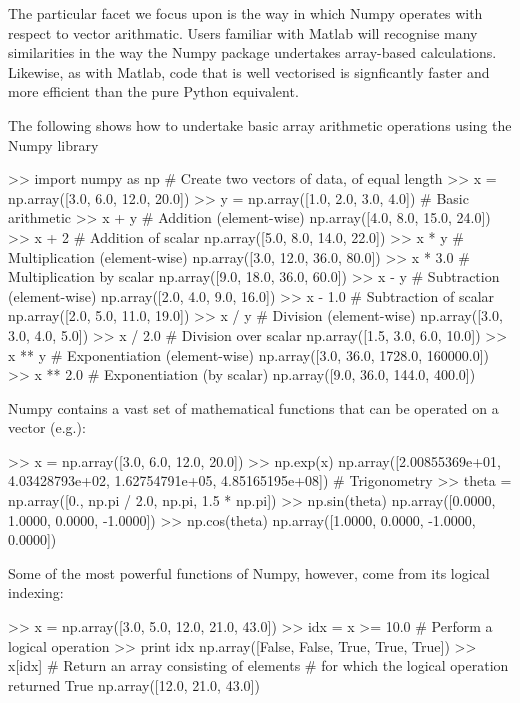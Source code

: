The particular facet we focus upon is the way in which Numpy operates with respect to vector arithmatic. Users familiar with Matlab will recognise many similarities in the way the Numpy package undertakes array-based calculations. Likewise, as with Matlab, code that is well vectorised is signficantly faster and more efficient than the pure Python equivalent. 

The following shows how to undertake basic array arithmetic operations using the Numpy library

\begin{python}[frame=single]
>> import numpy as np
# Create two vectors of data, of equal length
>> x = np.array([3.0, 6.0, 12.0, 20.0])
>> y = np.array([1.0, 2.0, 3.0, 4.0])
# Basic arithmetic
>> x + y   # Addition (element-wise)
np.array([4.0, 8.0, 15.0, 24.0])
>> x + 2   # Addition of scalar
np.array([5.0, 8.0, 14.0, 22.0])
>> x * y   # Multiplication (element-wise)
np.array([3.0, 12.0, 36.0, 80.0])
>> x * 3.0   # Multiplication by scalar
np.array([9.0, 18.0, 36.0, 60.0])
>> x - y   # Subtraction (element-wise)
np.array([2.0, 4.0, 9.0, 16.0])
>> x - 1.0   # Subtraction of scalar
np.array([2.0, 5.0, 11.0, 19.0])
>> x / y   # Division (element-wise)
np.array([3.0, 3.0, 4.0, 5.0])
>> x / 2.0   # Division over scalar
np.array([1.5, 3.0, 6.0, 10.0])
>> x ** y    # Exponentiation (element-wise)
np.array([3.0, 36.0, 1728.0, 160000.0])
>> x ** 2.0   # Exponentiation (by scalar)
np.array([9.0, 36.0, 144.0, 400.0])
\end{python}

Numpy contains a vast set of mathematical functions that can be operated on a vector (e.g.):

\begin{python}[frame=single]
>> x = np.array([3.0, 6.0, 12.0, 20.0])
>> np.exp(x)
np.array([2.00855369e+01, 4.03428793e+02, 1.62754791e+05,
         4.85165195e+08])
# Trigonometry
>> theta = np.array([0., np.pi / 2.0, np.pi, 1.5 * np.pi])
>> np.sin(theta)
np.array([0.0000, 1.0000, 0.0000, -1.0000])
>> np.cos(theta)
np.array([1.0000, 0.0000, -1.0000, 0.0000])
\end{python}

Some of the most powerful functions of Numpy, however, come from its logical indexing:

\begin{python}[frame=single]
>> x = np.array([3.0, 5.0, 12.0, 21.0, 43.0])
>> idx = x >= 10.0   # Perform a logical operation
>> print idx
np.array([False, False, True, True, True])
>> x[idx]   # Return an array consisting of elements
            # for which the logical operation returned True
np.array([12.0, 21.0, 43.0])
\end{python}

